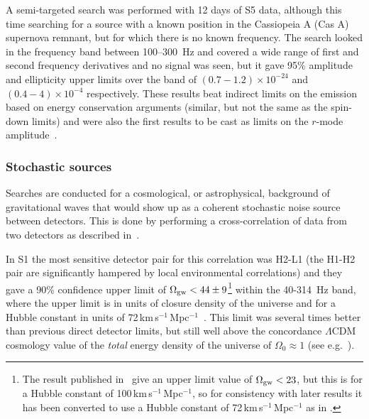 \documentclass{article}
\begin{document}
A semi-targeted search was performed with 12 days of S5 data, although this time
searching for a source with a known position in the Cassiopeia A (Cas A)
supernova remnant, but for which there is no known frequency. The search
\cite{Abadie:2010g} looked in the frequency band between 100--300~Hz and covered
a wide range of first and second frequency derivatives and no signal was seen,
but it gave 95\% amplitude and ellipticity upper limits over the band of
$(0.7-1.2)\times10^{-24}$ and $(0.4-4)\times10^{-4}$ respectively. These results
beat indirect limits on the emission based on energy conservation arguments
(similar, but not the same as the spin-down limits) and were also the first
results to be cast as limits on the $r$-mode amplitude~\cite{Owen:2010}.

\subsubsection{Stochastic sources}

Searches are conducted for a cosmological, or astrophysical, background of
gravitational waves that would show up as a coherent stochastic noise source
between detectors. This is done by performing a cross-correlation of data from
two detectors as described in~\cite{Allen:1999b}.

In S1 the most sensitive detector pair for this correlation was H2-L1 (the H1-H2
pair are significantly hampered by local environmental correlations) and they
gave a 90\% confidence upper limit of $\Omega_{\rm gw} < 44\pm9$\footnote{The
result published in~\cite{Abbott:2004e} give an upper limit value of
$\Omega_{\rm gw} < 23$, but this is for a Hubble constant
of 100\,km\,s$^{-1}$\,Mpc$^{-1}$, so for consistency with later results it has
been converted to use a Hubble constant of 72\,km\,s$^{-1}$\,Mpc$^{-1}$ as in
\cite{Abbott:2005h}.} within the 40-314~Hz band, where the upper limit is in
units of closure density of the universe and for a Hubble constant in units of
72\,km\,s$^{-1}$\,Mpc$^{-1}$~\cite{Abbott:2004e}. This limit was several times
better than previous direct detector limits, but still well above the
concordance $\Lambda$CDM cosmology value of the \textit{total} energy density of
the universe of $\Omega_0\approx1$ (see e.g.~\cite{Jarosik:2010}).
\end{document}
